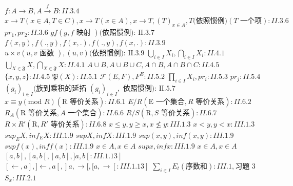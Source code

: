 \begin{Shaded}
\begin{Highlighting}[]
\end{Highlighting}
\end{Shaded}

\(f: A \to B, A \xrightarrow{f} B: II.3.4\) \(x \to T (x \in A, T \in C), x \to T (x \in A), x \to T, (T)_{x \in A}, T \text {(依照惯例)} (T \text { 一个项}): II.3.6\) \(pr_1, pr_2: II.3.6\) \(gf(g, f \text { 映射 }) \text {(依照惯例): II.3.7}\) \(f(x, y), f(., y), f(x, .), f(., y), f(x, .): II.3.9\) \(u \times v (u, v \text { 函数 }), (u, v) \text {(依照惯例): II.3.9}\) \(\bigcup_{i \in I} X_i, \bigcap_{i \in I} X_i: II.4.1\) \(\bigcup_{X \in \mathfrak{F}} X, \bigcap_{X \in \mathfrak{F}} X: II.4.1\) \(A \cup B, A \cup B \cup C, A \cap B, A \cap B \cap C: II.4.5\) \(\{x, y, z\}: II.4.5\) \(\mathfrak{P}(X): II.5.1\) \(\mathcal{F}(E, F), F^E: II.5.2\) \(\prod_{i \in I} X_i, pr_i: II.5.3\) \(pr_j: II.5.4\) \((g_i)_{i \in I} \text {(族到乘积的延拓 } (g_i)_{i \in I}, \text { 依照惯例): II.5.7}\) \(x \equiv y (\text {mod } R) (\text {R 等价关系}): II.6.1\) \(E/R (\text {E 一个集合}, R \text { 等价关系}): II.6.2\) \(R_A (\text {R 等价关系}, A \text { 一个集合}): II.6.6\) \(R/S (\text {R}, S \text { 等价关系}): II.6.7\) \(R \times R' (\text {R}, R' \text { 等价关系}): II.6.8\) \(x \leqslant y, y \geqslant x, x \not\leqslant y: III.1.3\) \(x < y, y < x: III.1.3\) \(sup_E X, inf_E X: III.1.9\) \(sup X, inf X: III.1.9\) \(sup (x, y), inf (x, y): III.1.9\) \(sup f(x), inf f(x): III.1.9\) \(x \in A, x \in A\) \(sup x, inf x: III.1.9\) \(x \in A, x \in A\) \([a, b], [a, b[, ]a, b], ]a, b[: III.1.13]\) \([\leftarrow, a], ]\leftarrow, a[, ]a, \rightarrow [, [a, \rightarrow[: III.1.13]\) \(\sum_{i \in I} E_t (\text {序数和}): III.1, \text{习题 3}\) \(S_x: III.2.1\)

